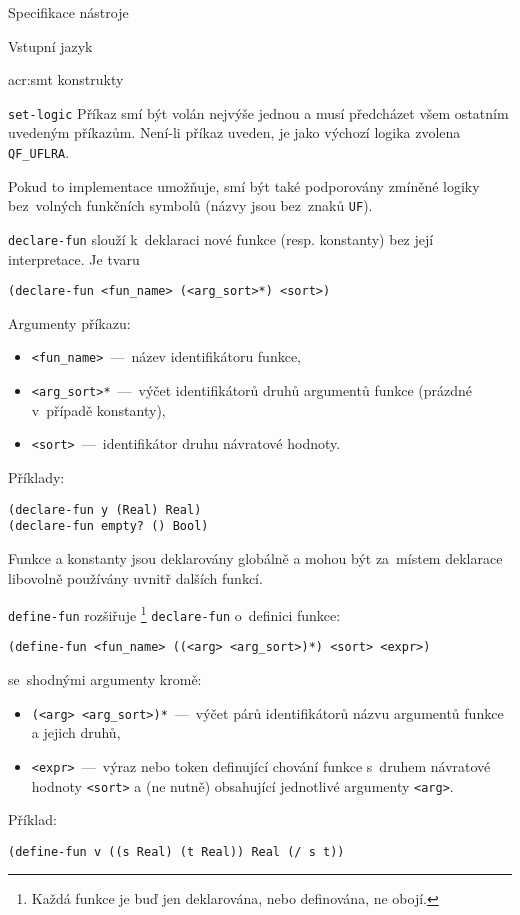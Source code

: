 \documentclass[thesis=M,czech]{FITthesis}[2012/06/26]
\newcommand{\acrlabel}[1]{acr:#1}
\newcommand{\acr}[1]{\acrshort{\acrlabel{#1}}}
\newcommand{\id}[1]{\texttt{#1}}
\begin{document}
\begin{section}{Specifikace nástroje}
\begin{subsection}{Vstupní jazyk}
\begin{subsubsection}{\acr{smt} konstrukty}
\begin{paragraph}{\id{set-logic}}
Příkaz smí být volán nejvýše jednou
a musí předcházet všem ostatním uvedeným příkazům.
Není-li příkaz uveden, je jako výchozí logika zvolena \id{QF\_\-UFLRA}.

Pokud to implementace umožňuje,
smí být také podporovány zmíněné logiky
bez~volných funkčních symbolů (názvy jsou bez~znaků \id{UF}).
\end{paragraph} %


\begin{paragraph}{\id{declare-fun}}\label{p:design:spec:ilang:smt:declfun}
slouží k~deklaraci nové funkce (resp. konstanty)
bez její interpretace.
Je tvaru
\begin{center}
\id{(declare-fun <fun\_\-name> (<arg\_\-sort>*) <sort>)}
\end{center}
Argumenty příkazu:
\begin{itemize}
\item \id{<fun\_\-name>}~---~název identifikátoru funkce,
\item \id{<arg\_\-sort>*}~---~výčet identifikátorů druhů
   argumentů funkce (prázdné v~případě konstanty),
\item \id{<sort>}~---~identifikátor druhu návratové hodnoty.
\end{itemize}
Příklady:
\begin{center}
\id{(declare-fun y (Real) Real)}\\
\id{(declare-fun empty? () Bool)}
\end{center}

Funkce a konstanty jsou deklarovány globálně
a mohou být za~místem deklarace
libovolně používány uvnitř dalších funkcí.
\end{paragraph} %


\begin{paragraph}{\id{define-fun}}\label{p:design:spec:ilang:smt:defun}
rozšiřuje%
\footnote{Každá funkce je buď jen deklarována,
nebo definována, ne obojí.}
\id{declare\--fun} o~definici funkce:
\begin{center}
\id{(define-fun <fun\_\-name> ((<arg> <arg\_\-sort>)*) <sort> <expr>)}
\end{center}
se~shodnými argumenty kromě:
\begin{itemize}
\item \id{(<arg> <arg\_\-sort>)*}~---~výčet párů identifikátorů
   názvu argumentů funkce a jejich druhů,
\item \id{<expr>}~---~výraz nebo token definující chování funkce
   s~druhem návratové hodnoty \id{<sort>}
   a (ne nutně) obsahující jednotlivé argumenty \id{<arg>}.
\end{itemize}
Příklad:
\begin{center}
\id{(define-fun v~((s~Real) (t Real)) Real (/ s~t))}
\end{center}
\end{paragraph} %


\end{subsubsection}
\end{subsection}
\end{section}
\end{document}
